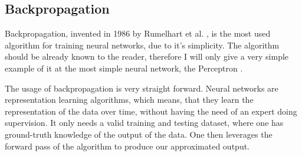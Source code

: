  \subsection{Backpropagation} \label{subsection::backpropagation}
  Backpropagation, invented in 1986 by Rumelhart et al. \cite{Rumelhart1986}, is the most used algorithm for training neural networks, due to it's simplicity.
  The algorithm should be already known to the reader, therefore I will only give a very simple example of it at the most simple neural network, the Perceptron \cite{Rosenblatt1957}.
  \begin{center}
  \end{center}
  The usage of backpropagation is very straight forward. Neural networks are representation learning algorithms, which means, that they learn the representation of the data over time, without
  having the need of an expert doing supervision. It only needs a valid training and testing dataset, where one has ground-truth knowledge of the output of the data. One then leverages
  the forward pass of the algorithm to produce our approximated output.
